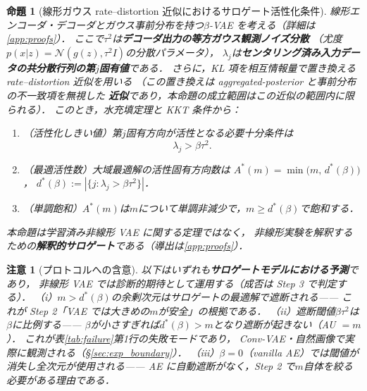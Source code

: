 \documentclass[11pt,a4paper]{jsarticle}
\newtheorem{proposition}{命題}
\newtheorem{remark}{注意}
\newcommand{\dstar}{d^{*}(\beta)}
\begin{document}
\begin{proposition}[線形ガウス rate--distortion 近似におけるサロゲート活性化条件]\label{thm:linear_vae}
線形エンコーダ・デコーダとガウス事前分布を持つ$\beta$-VAE を考える（詳細は\ref{app:proofs}）．
ここで$\tau^2$は\textbf{デコーダ出力の等方ガウス観測ノイズ分散}
（尤度$p(x|z) = \mathcal{N}(g(z), \tau^2 I)$の分散パラメータ），
$\lambda_j$は\textbf{センタリング済み入力データの共分散行列の第$j$固有値}である．
さらに，KL 項を相互情報量で置き換える rate--distortion 近似を用いる
（この置き換えは aggregated-posterior と事前分布の不一致項を無視した
\textbf{近似}であり，本命題の成立範囲はこの近似の範囲内に限られる）．
このとき，水充填定理と KKT 条件から：
\begin{enumerate}
  \item （活性化しきい値）第$j$固有方向が活性となる必要十分条件は
        \begin{equation}
          \lambda_j > \beta \tau^2 .
          \label{eq:au_threshold}
        \end{equation}
  \item （最適活性数）大域最適解の活性固有方向数は
        $A^*(m) = \min\bigl(m,\, \dstar\bigr)$，
        $\dstar := |\{j : \lambda_j > \beta\tau^2\}|$．
  \item （単調飽和）$A^*(m)$は$m$について単調非減少で，$m \geq \dstar$で飽和する．
\end{enumerate}
本命題は学習済み非線形 VAE に関する定理ではなく，
非線形実験を解釈するための\textbf{解釈的サロゲート}である（導出は\ref{app:proofs}）．
\end{proposition}

\begin{remark}[プロトコルへの含意]\label{rem:implication}
以下はいずれも\textbf{サロゲートモデルにおける予測}であり，
非線形 VAE では診断的期待として運用する（成否は Step 3 で判定する）．
（i）$m > \dstar$の余剰次元はサロゲートの最適解で遮断される——
これが Step 2「VAE では大きめの$m$が安全」の根拠である．
（ii）遮断閾値$\beta\tau^2$は$\beta$に比例する——
$\beta$が小さすぎれば$\dstar > m$となり遮断が起きない（AU $= m$）．
これが表\ref{tab:failure}第1行の失敗モードであり，
Conv-VAE・自然画像で実際に観測される（§\ref{sec:exp_boundary}）．
（iii）$\beta = 0$（vanilla AE）では閾値が消失し全次元が使用される——
AE に自動遮断がなく，Step 2 で$m$自体を絞る必要がある理由である．
\end{remark}
\end{document}
